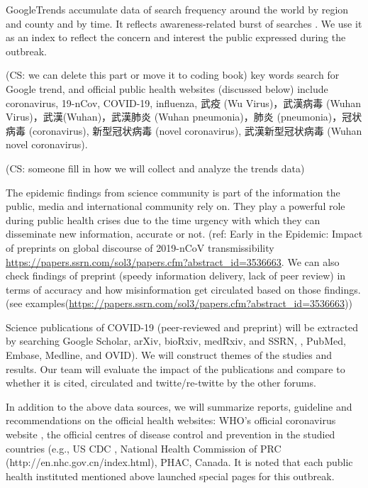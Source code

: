 \begin{CJK*}{UTF8}{gbsn}
GoogleTrends accumulate data of search frequency around the world by region and county and by time.  It reflects awareness-related burst of searches \cite{BousAgac17, MahrBrag19}.  We use it as an index to reflect the concern and interest the public expressed during the outbreak.  

(CS:  we can delete this part or move it to coding book) key words search for Google trend, and official public health websites (discussed below) include coronavirus, 19-nCov, COVID-19, influenza, 武疫 (Wu Virus)，武漢病毒 (Wuhan Virus)，武漢(Wuhan)，武漢肺炎 (Wuhan pneumonia)，肺炎 (pneumonia)，冠状病毒 (coronavirus), 新型冠状病毒 (novel coronavirus), 武漢新型冠状病毒 (Wuhan novel coronavirus).

(CS:  someone fill in how we will collect and analyze the trends data)
\end{CJK*}

The epidemic findings from science community is part of the information the public, media and international community rely on. They play a powerful role during public health crises due to the time urgency with which they can disseminate new information, accurate or not. (ref: Early in the Epidemic: Impact of preprints on global discourse of 2019-nCoV transmissibility \url{https://papers.ssrn.com/sol3/papers.cfm?abstract_id=3536663}.  We can also check findings of preprint (speedy information delivery, lack of peer review) in terms of accuracy and how misinformation get circulated based on those findings. (see examples(\url{https://papers.ssrn.com/sol3/papers.cfm?abstract_id=3536663}))

Science publications of COVID-19 (peer-reviewed and preprint) will be extracted by searching Google Scholar, arXiv, bioRxiv, medRxiv, and SSRN, , PubMed, Embase, Medline, and OVID).  We will construct themes of the studies and results.  Our team will evaluate the impact of the publications and compare to whether it is cited, circulated and twitte/re-twitte by the other forums.  

In addition to the above data sources, we will summarize reports, guideline and recommendations on the official health websites:  WHO’s official coronavirus website , the official centres of disease control and prevention in the studied countries (e.g., US CDC , National Health Commission of PRC (http://en.nhc.gov.cn/index.html), PHAC, Canada.   It is noted that each public health instituted mentioned above launched special pages for this outbreak.


